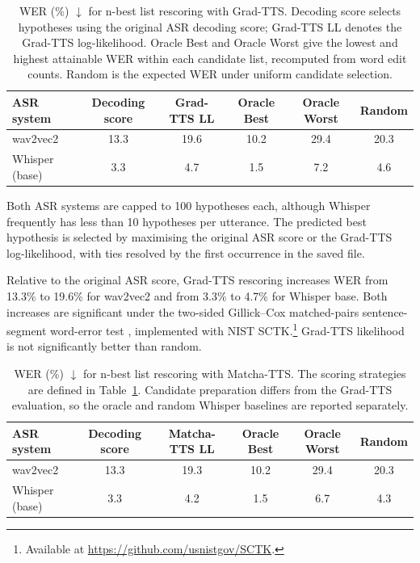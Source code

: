 \begin{table}[!htbp]
\centering
\caption{WER (\%) $\downarrow$ for n-best list rescoring with Grad-TTS. Decoding score selects hypotheses using the original ASR decoding score; Grad-TTS LL denotes the Grad-TTS log-likelihood. Oracle Best and Oracle Worst give the lowest and highest attainable WER within each candidate list, recomputed from word edit counts. Random is the expected WER under uniform candidate selection.}
\begin{tabular}{lccccc}
\toprule
\textbf{ASR system} & {Decoding score} & {Grad-TTS LL} & {Oracle Best} & {Oracle Worst} & {Random} \\
\midrule
wav2vec2 & 13.3 & 19.6 & 10.2 & 29.4 & 20.3\\
Whisper (base) & 3.3 & 4.7 & 1.5 & 7.2 & 4.6\\
\bottomrule
\end{tabular}
\label{tab:asr_reranking}
\end{table}
Both \ac{ASR} systems are capped to 100 hypotheses each, although Whisper frequently has less than 10 hypotheses per utterance. The predicted best hypothesis is selected by maximising the original \ac{ASR} score or the Grad-TTS log-likelihood, with ties resolved by the first occurrence in the saved file. 

Relative to the original \ac{ASR} score, Grad-TTS rescoring increases \ac{WER} from 13.3\% to 19.6\% for wav2vec2 and from 3.3\% to 4.7\% for Whisper base. Both increases are significant under the two-sided Gillick--Cox matched-pairs sentence-segment word-error test \citep{gillick1980mapwse}, implemented with NIST SCTK.\footnote{Available at \url{https://github.com/usnistgov/SCTK}.} Grad-TTS likelihood is not significantly better than random.

\begin{table}[!htbp]
    \centering
    \caption{WER (\%) $\downarrow$ for n-best list rescoring with Matcha-TTS. The scoring strategies are defined in Table~\ref{tab:asr_reranking}. Candidate preparation differs from the Grad-TTS evaluation, so the oracle and random Whisper baselines are reported separately. }
    \begin{tabular}{lccccc}
        \toprule
        \textbf{ASR system} & Decoding score & Matcha-TTS LL & Oracle Best & Oracle Worst & Random \\
        \midrule
        wav2vec2 & 13.3 & 19.3 & 10.2 & 29.4 & 20.3 \\
        Whisper (base) & 3.3 & 4.2 & 1.5 & 6.7 & 4.3 \\
        \bottomrule
    \end{tabular}
    \label{tab:matcha_asr_reranking}
\end{table}

